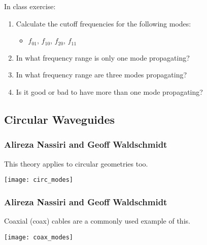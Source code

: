 \documentclass[professionalfonts,t]{beamer}
\begin{document}
{\begin{frame}
	In class exercise:
	\begin{enumerate}
		\item Calculate the cutoff frequencies for the following modes:
		\begin{itemize}
			\item $f_{01}$, $f_{10}$, $f_{20}$, $f_{11}$
		\end{itemize}
		\item In what frequency range is only one mode propagating?
		\item In what frequency range are three modes propagating?
		\item Is it good or bad to have more than one mode propagating?
	\end{enumerate}	
\end{frame}


\subsection{Circular Waveguides}
\begin{frame}
\frametitle{Alireza Nassiri and Geoff Waldschmidt}
This theory applies to circular geometries too.

\centering
	\texttt{[image: circ\_modes]}
	\vspace{-1em}
\end{frame}
\begin{frame}
\frametitle{Alireza Nassiri and Geoff Waldschmidt}
Coaxial (coax) cables are a commonly used example of this.

\centering
	\texttt{[image: coax\_modes]}
	\vspace{-1em}
\end{frame}

}

\fi


\iftrue
\end{document}
